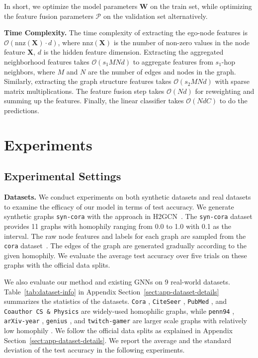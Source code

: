 \documentclass{article}
\theoremstyle{plain}
\newcommand{\mypar}[1]{{\vspace{0.05cm} \noindent \bf #1}}
\newcommand{\bigO}{\mathcal{O}}
\newcommand{\nnz}{\text{nnz}}
\begin{document}
In short, we optimize the model parameters $\mathbf{W}$ on the train set, while optimizing the feature fusion parameters $\mathcal{P}$ on the validation set alternatively.

\mypar{Time Complexity.} The time complexity of extracting the ego-node features is $\bigO(\nnz(\mathbf{X}) \cdot d)$, where $\nnz(\mathbf{X})$ is the number of non-zero values in the node feature $\mathbf{X}$, $d$ is the hidden feature dimension. Extracting the aggregated neighborhood features takes $\bigO(s_1 M N d)$ to aggregate features from $s_1$-hop neighbors, where $M$ and $N$ are the number of edges and nodes in the graph. Similarly, extracting the graph structure features takes $\bigO(s_2 M N d)$ with sparse matrix multiplications. The feature fusion step takes $\bigO(N d)$ for reweighting and summing up the features. Finally, the linear classifier takes $\bigO(N d C)$ to do the predictions.



\section{Experiments} \label{sec:Experiments}



\subsection{Experimental Settings} \label{sec:ExpSet}
\textbf{Datasets.}
We conduct experiments on both synthetic datasets and real datasets to examine the efficacy of our model in terms of test accuracy. 
We generate synthetic graphs \texttt{syn-cora} with the approach in H2GCN~\cite{zhu2020beyond}. 
The \texttt{syn-cora} dataset provides 11 graphs with homophily ranging from 0.0 to 1.0 with 0.1 as the interval.
The raw node features and labels for each graph are sampled from the \texttt{cora} dataset~\cite{sen2008collective}. 
The edges of the graph are generated gradually according to the given homophily.  
We evaluate the average test accuracy over five trials on these graphs with the official data splits.


We also evaluate our method and existing GNNs on 9 real-world datasets. 
Table~\ref{tab:dataset-info} in Appendix Section~\ref{sect:app-dataset-details} summarizes the statistics of the datasets. 
\texttt{Cora} \cite{sen2008collective}, \texttt{CiteSeer} \cite{sen2008collective}, \texttt{PubMed} \cite{sen2008collective}, and \texttt{Coauthor CS \& Physics} \cite{shchur2018pitfalls} are widely-used homophilic graphs, while \texttt{penn94} \cite{traud2012social}, \texttt{arXiv-year} \cite{hu2020open}, \texttt{genius} \cite{lim2021expertise}, and \texttt{twitch-gamer} \cite{rozemberczki2021twitch} are larger scale graphs with relatively low homophily \cite{lim2021new,lim2021large}. 
We follow the official data splits as explained in Appendix Section~\ref{sect:app-dataset-details}. We report the average and the standard deviation of the test accuracy in the following experiments.
\end{document}
